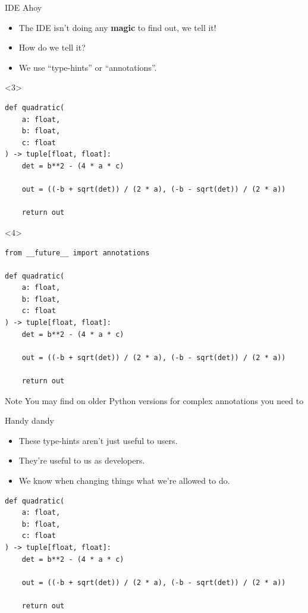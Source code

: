 \documentclass[usenames,dvipsnames]{beamer}
\newcommand{\kw}[1]{\textcolor{red}{\texttt{\detokenize{#1}}}}
\begin{document}
\begin{frame}[fragile]{IDE Ahoy}
    \begin{itemize}[<+->]
        \item{}The IDE isn't doing any \textbf{magic} to find out, we tell it!
        \item{}How do we tell it?
        \item{}We use ``type-hints'' or ``annotations''.
    \end{itemize}

    \begin{onlyenv}<3>
        \begin{lstlisting}[basicstyle=\scriptsize]
def quadratic(
    a: float, 
    b: float, 
    c: float
) -> tuple[float, float]:
    det = b**2 - (4 * a * c)

    out = ((-b + sqrt(det)) / (2 * a), (-b - sqrt(det)) / (2 * a))

    return out
        \end{lstlisting}
    \end{onlyenv}

    \begin{onlyenv}<4>
        \begin{lstlisting}[basicstyle=\scriptsize]
from __future__ import annotations
        
def quadratic(
    a: float, 
    b: float, 
    c: float
) -> tuple[float, float]:
    det = b**2 - (4 * a * c)

    out = ((-b + sqrt(det)) / (2 * a), (-b - sqrt(det)) / (2 * a))

    return out
        \end{lstlisting}

        \begin{block}{Note}
            You may find on older Python versions for complex annotations you need to 
            \kw{import annotations}
        \end{block}
    \end{onlyenv}
\end{frame}

\begin{frame}[fragile]{Handy dandy}
    \begin{itemize}[<+->]
        \item{}These type-hints aren't just useful to users.
        \item{}They're useful to us as developers.
        \item{}We know when changing things what we're allowed to do.
    \end{itemize}

    \begin{lstlisting}[basicstyle=\scriptsize]
def quadratic(
    a: float, 
    b: float, 
    c: float
) -> tuple[float, float]:
    det = b**2 - (4 * a * c)

    out = ((-b + sqrt(det)) / (2 * a), (-b - sqrt(det)) / (2 * a))

    return out
    \end{lstlisting}

\end{frame}
\end{document}
